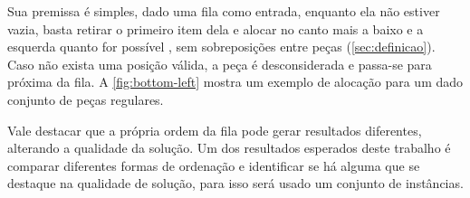 Sua premissa é simples, dado uma fila como entrada, enquanto ela não estiver vazia, basta retirar o primeiro item dela e alocar no canto mais a baixo e a esquerda quanto for possível \cite{aprendizado-reforco}, sem sobreposições entre peças (\autoref{sec:definicao}).
Caso não exista uma posição válida, a peça é desconsiderada e passa-se para próxima da fila.
A \autoref{fig:bottom-left} mostra um exemplo de alocação para um dado conjunto de peças regulares.

Vale destacar que a própria ordem da fila pode gerar resultados diferentes, alterando a qualidade da solução.
Um dos resultados esperados deste trabalho é comparar diferentes formas de ordenação e identificar se há alguma que se destaque na qualidade de solução, para isso será usado um conjunto de instâncias.


